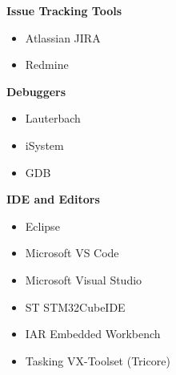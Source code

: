 \begin{minipage}[t]{0.48\textwidth}
\vspace{0.5em}

\textbf{Issue Tracking Tools}
\begin{itemize}[leftmargin=*,noitemsep,topsep=0pt]
    \item Atlassian JIRA 
    \item Redmine 
\end{itemize}

\vspace{0.5em}

\textbf{Debuggers}
\begin{itemize}[leftmargin=*,noitemsep,topsep=0pt]
    \item Lauterbach 
    \item iSystem 
    \item GDB 
\end{itemize}

\vspace{0.5em}

\textbf{IDE and Editors}
\begin{itemize}[leftmargin=*,noitemsep,topsep=0pt]
    \item Eclipse 
    \item Microsoft VS Code 
    \item Microsoft Visual Studio 
    \item ST STM32CubeIDE 
    \item IAR Embedded Workbench 
    \item Tasking VX-Toolset (Tricore) 
\end{itemize}
\end{minipage}
\hfill

